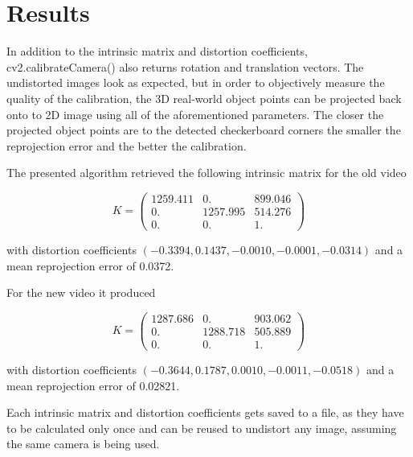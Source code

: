 \documentclass[bibliography=totoc]{scrartcl}
\begin{document}
\section{Results}
In addition to the intrinsic matrix and distortion coefficients, cv2.calibrateCamera() also returns rotation and translation vectors.
The undistorted images look as expected, but in order to objectively measure the quality of the calibration, the 3D real-world object points can be projected back onto to 2D image using all of the aforementioned parameters.
The closer the projected object points are to the detected checkerboard corners the smaller the reprojection error and the better the calibration.

The presented algorithm retrieved the following intrinsic matrix for the old video

$$
K =
\begin{pmatrix}
    1259.411 & 0. & 899.046 \\
    0. & 1257.995 & 514.276 \\
    0. & 0. & 1.
\end{pmatrix}
$$

with distortion coefficients
$(-0.3394, 0.1437, -0.0010, -0.0001, -0.0314)$
and a mean reprojection error of 0.0372.

For the new video it produced 

$$
K =
\begin{pmatrix}
    1287.686 & 0. & 903.062 \\
    0. & 1288.718 & 505.889 \\
    0. & 0. & 1.
\end{pmatrix}
$$

with distortion coefficients
$(-0.3644, 0.1787, 0.0010, -0.0011, -0.0518)$
and a mean reprojection error of 0.02821.

Each intrinsic matrix and distortion coefficients gets saved to a file, as they have to be calculated only once and can be reused to undistort any image, assuming the same camera is being used.

\clearpage


\end{document}
